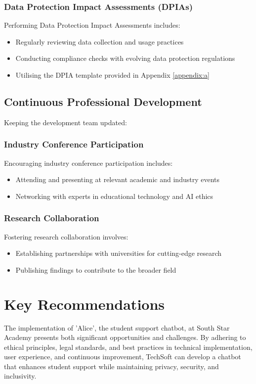 \documentclass[15pt,a4paper]{article}
\begin{document}
\begin{multicols}{2}
\subsubsection*{Data Protection Impact Assessments (DPIAs)}
Performing Data Protection Impact Assessments \textit{\parencite{ICO2024}} includes:
\begin{itemize}
    \item Regularly reviewing data collection and usage practices
    \item Conducting compliance checks with evolving data protection regulations
    \item Utilising the DPIA template provided in Appendix \ref{appendix:a}
\end{itemize}

\subsection{Continuous Professional Development}
Keeping the development team updated:

\subsubsection*{Industry Conference Participation}
Encouraging industry conference participation \textit{\parencite{IEEE2024}} includes:
\begin{itemize}
    \item Attending and presenting at relevant academic and industry events
    \item Networking with experts in educational technology and AI ethics
\end{itemize}

\subsubsection*{Research Collaboration}
Fostering research collaboration \textit{\parencite[pp. 50-100]{Dillenbourg2023}} involves:
\begin{itemize}
    \item Establishing partnerships with universities for cutting-edge research
    \item Publishing findings to contribute to the broader field
\end{itemize}

\section{Key Recommendations}
The implementation of 'Alice', the student support chatbot, at South Star Academy presents both significant opportunities and challenges. By adhering to ethical principles, legal standards, and best practices in technical implementation, user experience, and continuous improvement, TechSoft can develop a chatbot that enhances student support while maintaining privacy, security, and inclusivity.


\end{multicols}
\end{document}
